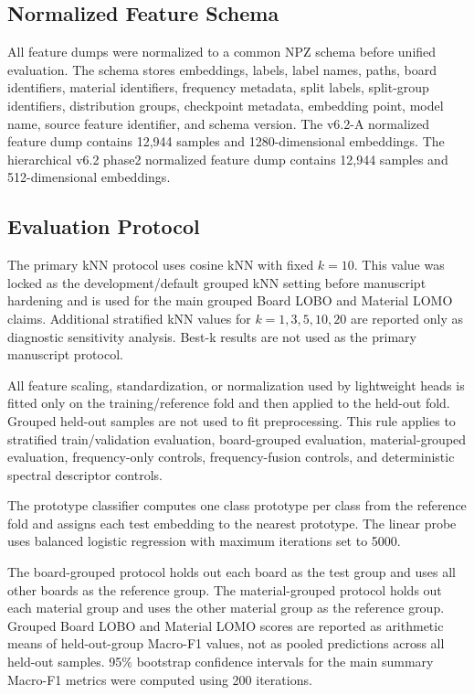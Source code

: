 \documentclass[review,3p,times]{elsarticle}
\begin{document}
\subsection{Normalized Feature Schema}
All feature dumps were normalized to a common NPZ schema before unified evaluation. The schema stores embeddings, labels, label names, paths, board identifiers, material identifiers, frequency metadata, split labels, split-group identifiers, distribution groups, checkpoint metadata, embedding point, model name, source feature identifier, and schema version. The v6.2-A normalized feature dump contains 12,944 samples and 1280-dimensional embeddings. The hierarchical v6.2 phase2 normalized feature dump contains 12,944 samples and 512-dimensional embeddings.

\subsection{Evaluation Protocol}
The primary kNN protocol uses cosine kNN with fixed $k=10$. This value was locked as the development/default grouped kNN setting before manuscript hardening and is used for the main grouped Board LOBO and Material LOMO claims. Additional stratified kNN values for $k = 1, 3, 5, 10, 20$ are reported only as diagnostic sensitivity analysis. Best-k results are not used as the primary manuscript protocol.

All feature scaling, standardization, or normalization used by lightweight heads is fitted only on the training/reference fold and then applied to the held-out fold. Grouped held-out samples are not used to fit preprocessing. This rule applies to stratified train/validation evaluation, board-grouped evaluation, material-grouped evaluation, frequency-only controls, frequency-fusion controls, and deterministic spectral descriptor controls.

The prototype classifier computes one class prototype per class from the reference fold and assigns each test embedding to the nearest prototype. The linear probe uses balanced logistic regression with maximum iterations set to 5000.

The board-grouped protocol holds out each board as the test group and uses all other boards as the reference group. The material-grouped protocol holds out each material group and uses the other material group as the reference group. Grouped Board LOBO and Material LOMO scores are reported as arithmetic means of held-out-group Macro-F1 values, not as pooled predictions across all held-out samples. 95\% bootstrap confidence intervals for the main summary Macro-F1 metrics were computed using 200 iterations.
\end{document}
